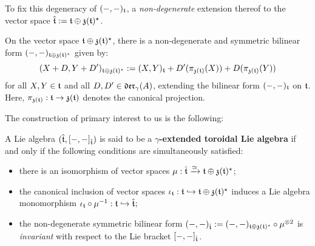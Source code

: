         To fix this degeneracy of $(-, -)_{\mathfrak{t}}$, a \textit{non-degenerate} extension thereof to the vector space $\hat{\mathfrak{t}} := \mathfrak{t} \oplus \mathfrak{z}(\mathfrak{t})^{\star}$.
        \begin{lemma} \label{lemma: extended_toroidal_bilinear_form}
            On the vector space $\mathfrak{t} \oplus \mathfrak{z}(\mathfrak{t})^{\star}$, there is a non-degenerate and symmetric bilinear form $(-, -)_{\mathfrak{t} \oplus \mathfrak{z}(\mathfrak{t})^{\star}}$ given by:
                $$( X + D, Y + D' )_{\mathfrak{t} \oplus \mathfrak{z}(\mathfrak{t})^{\star}} := (X, Y)_{\mathfrak{t}} + D'( \pi_{\mathfrak{z}(\mathfrak{t})}(X) ) + D( \pi_{\mathfrak{z}(\mathfrak{t})}(Y) )$$
            for all $X, Y \in \mathfrak{t}$ and all $D, D' \in \mathfrak{der}_{\gamma}(A)$, extending the bilinear form $(-, -)_{\mathfrak{t}}$ on $\mathfrak{t}$. Here, $\pi_{\mathfrak{z}(\mathfrak{t})}: \mathfrak{t} \to \mathfrak{z}(\mathfrak{t})$ denotes the canonical projection.
        \end{lemma}

        The construction of primary interest to us is the following:
        \begin{definition} \label{def: yangian_extended_toroidal_lie_algebras}
            A Lie algebra $(\hat{\mathfrak{t}}, [-, -]_{\hat{\mathfrak{t}}})$ is said to be a \textbf{$\gamma$-extended toroidal Lie algebra} if and only if the following conditions are simultaneously satisfied:
            \begin{itemize}
                \item there is an isomorphism of vector spaces $\mu: \hat{\mathfrak{t}} \xrightarrow[]{\simeq} \mathfrak{t} \oplus \mathfrak{z}(\mathfrak{t})^{\star}$;
                \item the canonical inclusion of vector spaces $\iota_{\mathfrak{t}}: \mathfrak{t} \hookrightarrow \mathfrak{t} \oplus \mathfrak{z}(\mathfrak{t})^{\star}$ induces a Lie algebra monomorphism $\iota_{\mathfrak{t}} \circ \mu^{-1}: \mathfrak{t} \hookrightarrow \hat{\mathfrak{t}}$;
                \item the non-degenerate symmetric bilinear form $(-, -)_{\extendedtoroidal} := (-, -)_{\toroidal \oplus \z(\toroidal)^{\star}} \circ \mu^{\tensor 2}$ is \textit{invariant} with respect to the Lie bracket $[-, -]_{\hat{\mathfrak{t}}}$.
            \end{itemize}
        \end{definition}